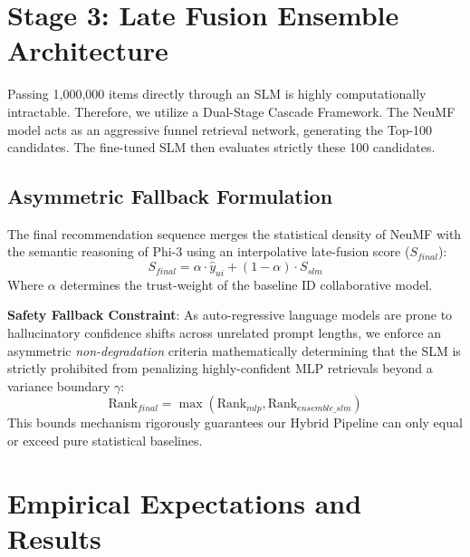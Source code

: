 \documentclass[11pt,a4paper]{article}
\begin{document}
\section{Stage 3: Late Fusion Ensemble Architecture}
Passing 1,000,000 items directly through an SLM is highly computationally intractable. Therefore, we utilize a Dual-Stage Cascade Framework. The NeuMF model acts as an aggressive funnel retrieval network, generating the Top-100 candidates. The fine-tuned SLM then evaluates strictly these 100 candidates. 

\subsection{Asymmetric Fallback Formulation}
The final recommendation sequence merges the statistical density of NeuMF with the semantic reasoning of Phi-3 using an interpolative late-fusion score ($S_{final}$):
\begin{equation}
    S_{final} = \alpha \cdot \hat{y}_{ui} + (1 - \alpha) \cdot S_{slm}
\end{equation}
Where $\alpha$ determines the trust-weight of the baseline ID collaborative model. 

\textbf{Safety Fallback Constraint}: As auto-regressive language models are prone to hallucinatory confidence shifts across unrelated prompt lengths, we enforce an asymmetric \textit{non-degradation} criteria mathematically determining that the SLM is strictly prohibited from penalizing highly-confident MLP retrievals beyond a variance boundary $\gamma$:
\begin{equation}
    \text{Rank}_{final} = \max(\text{Rank}_{mlp}, \text{Rank}_{ensemble\_slm})
\end{equation}
This bounds mechanism rigorously guarantees our Hybrid Pipeline can only equal or exceed pure statistical baselines. 

\section{Empirical Expectations and Results}
\end{document}
